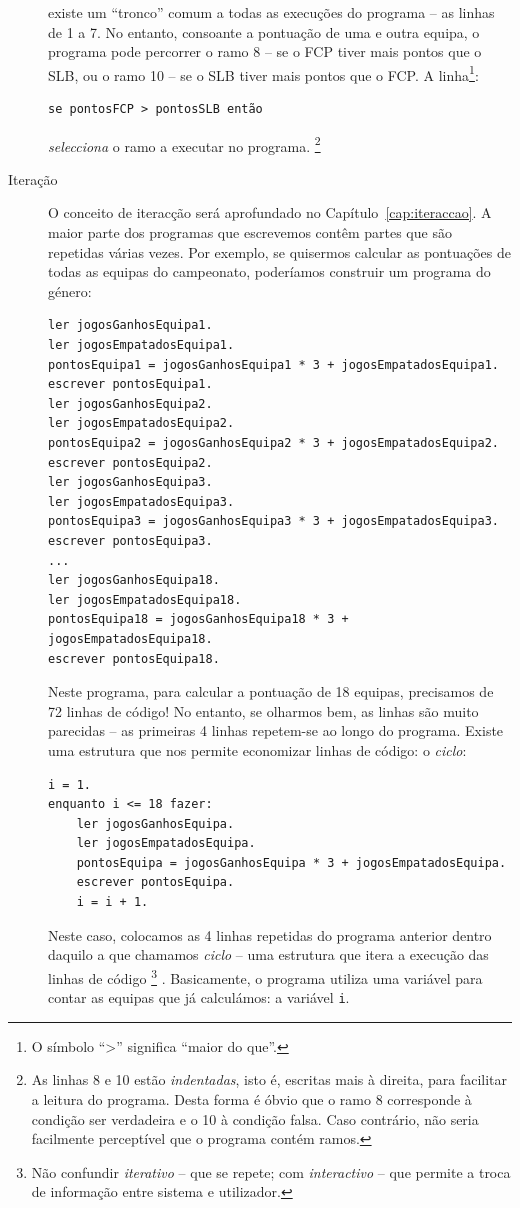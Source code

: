 \begin{description}
existe um ``tronco'' comum a todas as execuções do programa -- as linhas de 1 a 7.
No entanto, consoante a pontuação de uma e outra equipa, o programa pode percorrer o ramo 8 -- se o FCP tiver mais pontos que o SLB, ou o ramo 10 -- se o SLB tiver mais pontos que o FCP.
A linha\footnote{O símbolo ``>'' significa ``maior do que''.}: 
\begin{lstlisting}[firstnumber=7]
se pontosFCP > pontosSLB então      
\end{lstlisting}

\emph{selecciona} o ramo a executar no programa.%
\footnote{As linhas 8 e 10 estão \emph{indentadas}, isto é, escritas mais à direita, para facilitar a leitura do programa. Desta forma é óbvio que o ramo 8 corresponde à condição ser verdadeira e o 10 à condição falsa. Caso contrário, não seria facilmente perceptível que o programa contém ramos.}

\item[Iteração] O conceito de iteracção será aprofundado no Capítulo~\ref{cap:iteraccao}.
A maior parte dos programas que escrevemos contêm partes que são repetidas várias vezes. Por exemplo, se quisermos calcular as pontuações de todas as equipas do campeonato, poderíamos construir um programa do género:

\begin{lstlisting}
ler jogosGanhosEquipa1.
ler jogosEmpatadosEquipa1.
pontosEquipa1 = jogosGanhosEquipa1 * 3 + jogosEmpatadosEquipa1.
escrever pontosEquipa1.
ler jogosGanhosEquipa2.
ler jogosEmpatadosEquipa2.
pontosEquipa2 = jogosGanhosEquipa2 * 3 + jogosEmpatadosEquipa2.
escrever pontosEquipa2.
ler jogosGanhosEquipa3.
ler jogosEmpatadosEquipa3.
pontosEquipa3 = jogosGanhosEquipa3 * 3 + jogosEmpatadosEquipa3.
escrever pontosEquipa3.
...
ler jogosGanhosEquipa18.
ler jogosEmpatadosEquipa18.
pontosEquipa18 = jogosGanhosEquipa18 * 3 + jogosEmpatadosEquipa18.
escrever pontosEquipa18.
\end{lstlisting}
Neste programa, para calcular a pontuação de 18 equipas, precisamos de 72 linhas de código! No entanto, se olharmos bem, as linhas são muito parecidas -- as primeiras 4 linhas repetem-se ao longo do programa. Existe uma estrutura que nos permite economizar linhas de código: o \emph{ciclo}:

\begin{lstlisting}
i = 1.
enquanto i <= 18 fazer:
	ler jogosGanhosEquipa.
    ler jogosEmpatadosEquipa.
    pontosEquipa = jogosGanhosEquipa * 3 + jogosEmpatadosEquipa.
    escrever pontosEquipa.
    i = i + 1.
\end{lstlisting}
Neste caso, colocamos as 4 linhas repetidas do programa anterior dentro daquilo a que chamamos \emph{ciclo} -- uma estrutura que itera a execução das linhas de código%
\footnote{Não confundir \emph{iterativo} -- que se repete; com \emph{interactivo} -- que permite a troca de informação entre sistema e utilizador.}%
. 
Basicamente, o programa utiliza uma variável para contar as equipas que já calculámos: a variável \texttt{i}.


\end{description}
